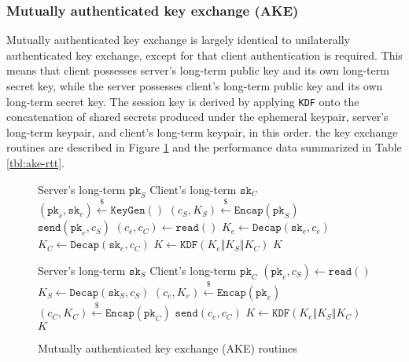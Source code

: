 \documentclass[journal=tches,submission]{iacrtrans}
\newcommand{\keygen}{\texttt{KeyGen}}
\newcommand{\encap}{\texttt{Encap}}
\newcommand{\decap}{\texttt{Decap}}
\newcommand{\pk}{\texttt{pk}}
\newcommand{\sk}{\texttt{sk}}
\newcommand{\leftsample}{\stackrel{\$}{\leftarrow}}
\begin{document}
\subsubsection{Mutually authenticated key exchange (AKE)}\label{sec:akex}
Mutually authenticated key exchange is largely identical to unilaterally authenticated key exchange, except for that client authentication is required. This means that client possesses server's long-term public key and its own long-term secret key, while the server possesses client's long-term public key and its own long-term secret key. The session key is derived by applying \texttt{KDF} onto the concatenation of shared secrets produced under the ephemeral keypair, server's long-term keypair, and client's long-term keypair, in this order. the key exchange routines are described in Figure \ref{fig:ake-routines} and the performance data summarized in Table \ref{tbl:ake-rtt}.

\begin{figure}[h]
    \centering
    \begin{minipage}[b]{0.49\textwidth}
        \begin{algorithm}[H]
            \caption*{$\texttt{AKE}_\texttt{C}(\pk_S, \sk_C)$}
            \begin{algorithmic}[1]
                \Require Server's long-term $\pk_S$
                \Require Client's long-term $\sk_C$
                \State $(\pk_e, \sk_e) \leftsample \keygen()$
                \State $(c_S, K_S) \leftsample \encap(\pk_S)$
                \State $\texttt{send}(\pk_e, c_S)$
                \State $(c_e, c_C) \leftarrow \texttt{read}()$
                \State $K_e \leftarrow \decap(\sk_e, c_e)$
                \State $K_C \leftarrow \decap(\sk_e, c_C)$
                \State $K \leftarrow \texttt{KDF}(K_e \Vert K_S \Vert K_C)$
                \State \Return $K$
            \end{algorithmic}
        \end{algorithm}
    \end{minipage}
    \begin{minipage}[b]{0.49\textwidth}
        \begin{algorithm}[H]
            \caption*{$\texttt{AKE}_\texttt{S}(\sk_S, \pk_C)$}
            \begin{algorithmic}[1]
                \Require Server's long-term $\sk_S$
                \Require Client's long-term $\pk_C$
                \State $(\pk_e, c_S) \leftarrow \texttt{read}()$
                \State $K_S \leftarrow \decap(\sk_S, c_S)$
                \State $(c_e, K_e) \leftsample \encap(\pk_e)$
                \State $(c_C, K_C) \leftsample \encap(\pk_C)$
                \State $\texttt{send}(c_e, c_C)$
                \State $K \leftarrow \texttt{KDF}(K_e \Vert K_S \Vert K_C)$
                \State \Return $K$
            \end{algorithmic}
        \end{algorithm}
    \end{minipage}
    
    \caption{Mutually authenticated key exchange (AKE) routines}\label{fig:ake-routines}
\end{figure}
\end{document}
